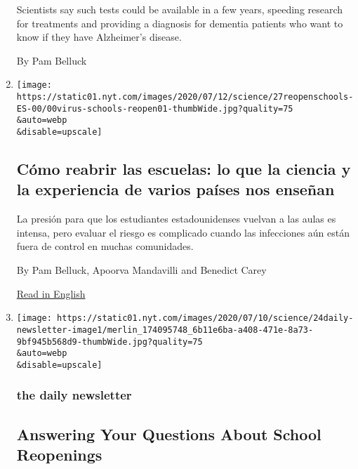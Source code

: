\begin{enumerate}
  Scientists say such tests could be available in a few years, speeding
  research for treatments and providing a diagnosis for dementia
  patients who want to know if they have Alzheimer's disease.

  By Pam Belluck
\item
  \href{/es/2020/07/27/espanol/ciencia-y-tecnologia/regreso-a-clases-coronavirus.html}{}

  \texttt{[image: https://static01.nyt.com/images/2020/07/12/science/27reopenschools-ES-00/00virus-schools-reopen01-thumbWide.jpg?quality=75\\\&auto=webp\\\&disable=upscale]}

  \hypertarget{cuxf3mo-reabrir-las-escuelas-lo-que-la-ciencia-y-la-experiencia-de-varios-pauxedses-nos-enseuxf1an}{%
  \subsection{Cómo reabrir las escuelas: lo que la ciencia y la
  experiencia de varios países nos
  enseñan}\label{cuxf3mo-reabrir-las-escuelas-lo-que-la-ciencia-y-la-experiencia-de-varios-pauxedses-nos-enseuxf1an}}

  La presión para que los estudiantes estadounidenses vuelvan a las
  aulas es intensa, pero evaluar el riesgo es complicado cuando las
  infecciones aún están fuera de control en muchas comunidades.

  By Pam Belluck, Apoorva Mandavilli and Benedict Carey

  \href{https://www.nytimes.com/2020/07/11/health/coronavirus-schools-reopen.html}{Read
  in English}
\item
  \href{/2020/07/24/podcasts/daily-newsletter-schools-reopening-summer-playlist.html}{}

  \texttt{[image: https://static01.nyt.com/images/2020/07/10/science/24daily-newsletter-image1/merlin\_174095748\_6b11e6ba-a408-471e-8a73-9bf945b568d9-thumbWide.jpg?quality=75\\\&auto=webp\\\&disable=upscale]}

  \hypertarget{the-daily-newsletter}{%
  \subsubsection{the daily newsletter}\label{the-daily-newsletter}}

  \hypertarget{answering-your-questions-about-school-reopenings}{%
  \subsection{Answering Your Questions About School
  Reopenings}\label{answering-your-questions-about-school-reopenings}}


\end{enumerate}
